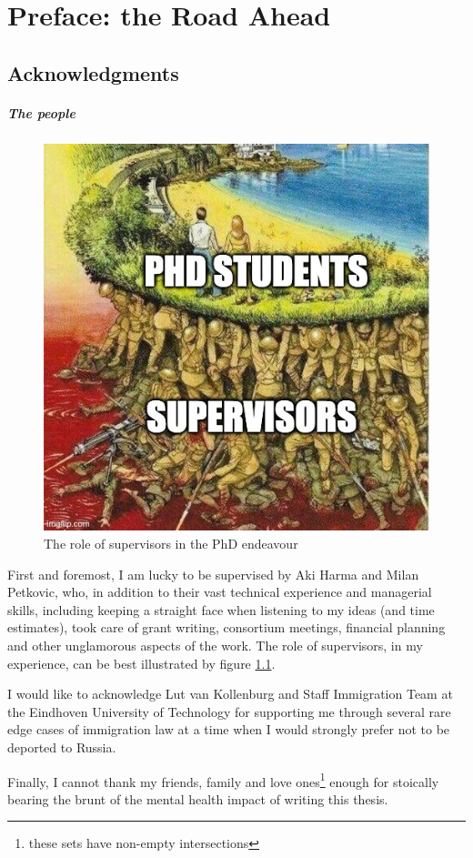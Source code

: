 \chapter{Preface: the Road Ahead}
\label{ch:preface}

\section{Acknowledgments}

\paragraph{The people}

\begin{figure}
    \centering
    \includegraphics[width=0.55\linewidth]{images/soldiers_meme.jpg}
    \caption{The role of supervisors in the PhD endeavour}
    \label{fig:soldiers-meme}
\end{figure}

First and foremost, I am lucky to be supervised by Aki Harma and Milan Petkovic, who, in addition to their vast technical experience and managerial skills, including keeping a straight face when listening to my ideas (and time estimates), took care of grant writing, consortium meetings, financial planning and other unglamorous aspects of the work.
The role of supervisors, in my experience, can be best illustrated by figure \ref{fig:soldiers-meme}.

I would like to acknowledge Lut van Kollenburg and Staff Immigration Team at the Eindhoven University of Technology for supporting me through several rare edge cases of immigration law at a time when I would strongly prefer not to be deported to Russia. 

Finally, I cannot thank my friends, family and love ones\footnote{these sets have non-empty intersections} enough for stoically bearing the brunt of the mental health impact of writing this thesis.

